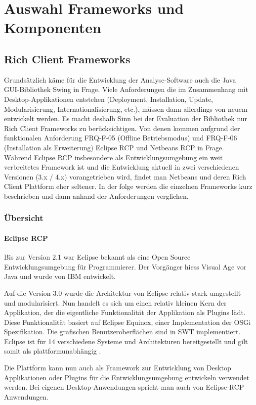 \chapter{Auswahl Frameworks und Komponenten}\label{selection_rcp_fw}
\section{Rich Client Frameworks}
Grundsätzlich käme für die Entwicklung der Analyse-Software auch die Java GUI-Bibliothek Swing in Frage. Viele Anforderungen die im Zusammenhang mit Desktop-Applikationen entstehen (Deployment, Installation, Update, Modularisierung, Internationalisierung, etc.), müssen dann allerdings von neuem entwickelt werden. Es macht deshalb Sinn bei der Evaluation der Bibliothek nur Rich Client Frameworks zu berücksichtigen. Von denen kommen aufgrund der funktionalen Anforderung FRQ-F-05 (Offline Betriebsmodus) und FRQ-F-06 (Installation als Erweiterung) Eclipse RCP und Netbeans RCP in Frage. Während Eclipse RCP insbesondere als Entwicklungsumgebung ein weit verbreitetes Framework ist und die Entwicklung aktuell in zwei verschiedenen Versionen (3.x / 4.x) vorangetrieben wird, findet man Netbeans und deren Rich Client Plattform eher seltener. In der folge werden die einzelnen Frameworks kurz beschrieben und dann anhand der Anforderungen verglichen.


\subsection{Übersicht}
\subsubsection{Eclipse RCP}
Bis zur Version 2.1 war Eclipse bekannt als eine Open Source Entwicklungsumgebung für Programmierer. Der Vorgänger hiess Visual Age vor Java und wurde von IBM entwickelt. 

Auf die Version 3.0 wurde die Architektur von Eclipse relativ stark umgestellt und modularisiert. Nun handelt es sich um einen relativ kleinen Kern der Applikation, der die eigentliche Funktionalität der Applikation als Plugins lädt. Diese Funktionalität basiert auf Eclipse Equinox, einer Implementation der OSGi Spezifikation. Die grafischen Benutzeroberflächen sind in SWT implementiert. Eclipse ist für 14 verschiedene Systeme und Architekturen bereitgestellt und gilt somit als plattformunabhängig \cite{wiki:eclipse}. 

Die Plattform kann nun auch als Framework zur Entwicklung von Desktop Applikationen oder Plugins für die Entwicklungsumgebung entwickeln verwendet werden. Bei eigenen Desktop-Anwendungen spricht man auch von Eclipse-RCP Anwendungen.



